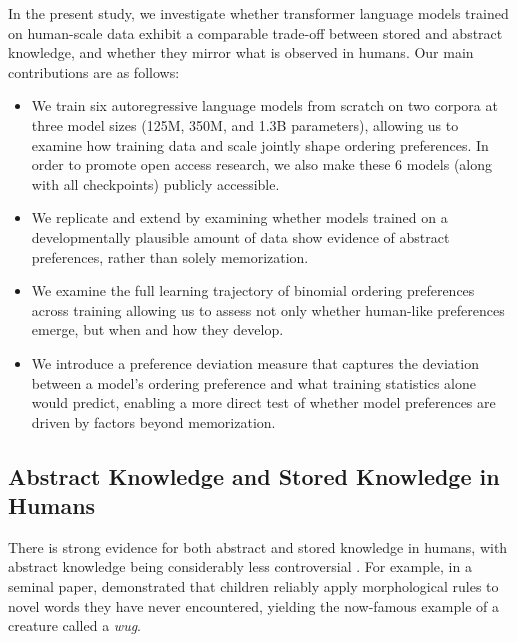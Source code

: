 \documentclass{article}
\providecommand{\tightlist}{%
  \setlength{\itemsep}{0pt}\setlength{\parskip}{0pt}}
\begin{document}
In the present study, we investigate whether transformer language models
trained on human-scale data exhibit a comparable trade-off between
stored and abstract knowledge, and whether they mirror what is observed
in humans. Our main contributions are as follows:

\begin{itemize}
\tightlist
\item
  We train six autoregressive language models from scratch on two
  corpora
  \citetext{\citealp[BabyLM,][]{charpentier2025babylmturns3}; \citealp[and
  a subset of C4,][]{raffelExploringLimitsTransfer2020}} at three model
  sizes (125M, 350M, and 1.3B parameters), allowing us to examine how
  training data and scale jointly shape ordering preferences. In order
  to promote open access research, we also make these 6 models (along
  with all checkpoints) publicly accessible.
\item
  We replicate and extend
  \citet{houghton2025roleabstractrepresentations} by examining whether
  models trained on a developmentally plausible amount of data show
  evidence of abstract preferences, rather than solely memorization.
\item
  We examine the full learning trajectory of binomial ordering
  preferences across training allowing us to assess not only whether
  human-like preferences emerge, but when and how they develop.
\item
  We introduce a preference deviation measure that captures the
  deviation between a model's ordering preference and what training
  statistics alone would predict, enabling a more direct test of whether
  model preferences are driven by factors beyond memorization.
\end{itemize}

\subsection{Abstract Knowledge and Stored Knowledge in
Humans}\label{abstract-knowledge-and-stored-knowledge-in-humans}

There is strong evidence for both abstract and stored knowledge in
humans, with abstract knowledge being considerably less controversial
\citep[cf.][]{ambridgeStoredAbstractionsRadical2020}. For example, in a
seminal paper, \citet{berkoChildsLearningEnglish1958} demonstrated that
children reliably apply morphological rules to novel words they have
never encountered, yielding the now-famous example of a creature called
a \emph{wug}.
\end{document}
